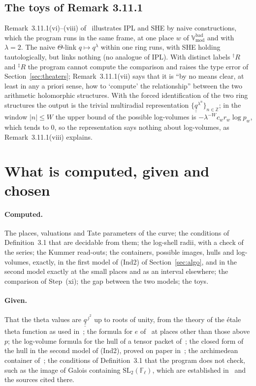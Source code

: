 \documentclass[11pt,a4paper]{article}
\newcommand{\qq}{\underline{\underline{q}}{}}
\newcommand{\F}{\mathbb{F}}
\newcommand{\Z}{\mathbb{Z}}
\newcommand{\Vbad}{\mathbb{V}^{\mathrm{bad}}_{\mathrm{mod}}}
\begin{document}
\subsection{The toys of Remark 3.11.1}\label{sec:toys}
Remark~3.11.1(vi)--(viii) of~\cite{IUT3} illustrates IPL and SHE by naive constructions, which the program runs in
the same frame, at one place $w$ of $\Vbad$ and with $\lambda=2$. The naive $\Theta$-link $q\mapsto q^\lambda$
within one ring runs, with SHE holding tautologically, but links nothing (no analogue of IPL). With distinct labels
${}^\dagger R$ and ${}^\ddagger R$ the program cannot compute the comparison and raises the type error of
Section~\ref{sec:theaters}; Remark~3.11.1(vii) says that it is ``by no means clear, at least in any a priori sense, how
to `compute' the relationship'' between the two arithmetic holomorphic structures. With the forced identification of the two ring structures the output is the trivial
multiradial representation $\{\qq^{\lambda^n}\}_{n\in\Z}$; in the window $|n|\le W$ the upper bound of the possible
log-volumes is $-\lambda^{-W}c_wr_w\log p_w$, which tends to $0$, so the representation says nothing about
log-volumes, as Remark~3.11.1(viii) explains.

\section{What is computed, given and chosen}\label{sec:limits}
\paragraph{Computed.} The places, valuations and Tate parameters of the curve; the conditions of Definition~3.1 that
are decidable from them; the log-shell radii, with a check of the series; the Kummer read-outs; the containers,
possible images, hulls and log-volumes, exactly, in the first model of (Ind2) of Section~\ref{sec:algo}, and in the
second model exactly at the small places and as an interval elsewhere; the comparison of Step~(xi); the gap between
the two models; the toys.

\paragraph{Given.} That the theta values are $\qq^{\,j^2}$ up to roots of unity, from the theory of the \'etale theta
function as used in~\cite{IUT2}; the formula for $e$ of~\cite{Cat} at places other than those above $p$; the
log-volume formula for the hull of a tensor packet of~\cite{LANAiut}; the closed form of the hull in the second model
of (Ind2), proved on paper in~\cite{Gap}; the archimedean container
of~\cite[Thm.~1.10, proof, Step~(vii)]{IUT4}; the conditions of Definition~3.1 that the program does not check, such
as the image of Galois containing $\mathrm{SL}_2(\F_\ell)$, which are established in~\cite{Cat} and the sources cited
there.
\end{document}
